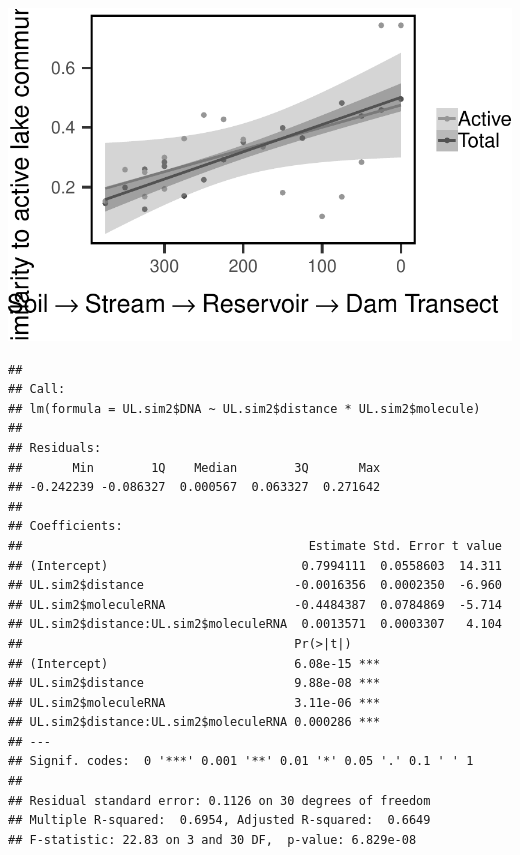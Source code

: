 \documentclass[]{article}
\newenvironment{Shaded}{\begin{snugshade}}{\end{snugshade}}
\newcommand{\KeywordTok}[1]{\textcolor[rgb]{0.13,0.29,0.53}{\textbf{#1}}}
\newcommand{\StringTok}[1]{\textcolor[rgb]{0.31,0.60,0.02}{#1}}
\newcommand{\CommentTok}[1]{\textcolor[rgb]{0.56,0.35,0.01}{\textit{#1}}}
\newcommand{\OperatorTok}[1]{\textcolor[rgb]{0.81,0.36,0.00}{\textbf{#1}}}
\newcommand{\NormalTok}[1]{#1}
\begin{document}
\begin{center}\includegraphics[width=0.7\linewidth]{ReservoirGradient_files/figure-latex/unnamed-chunk-8-2} \end{center}

\begin{Shaded}
\end{Shaded}

\begin{verbatim}
## 
## Call:
## lm(formula = UL.sim2$DNA ~ UL.sim2$distance * UL.sim2$molecule)
## 
## Residuals:
##       Min        1Q    Median        3Q       Max 
## -0.242239 -0.086327  0.000567  0.063327  0.271642 
## 
## Coefficients:
##                                        Estimate Std. Error t value
## (Intercept)                           0.7994111  0.0558603  14.311
## UL.sim2$distance                     -0.0016356  0.0002350  -6.960
## UL.sim2$moleculeRNA                  -0.4484387  0.0784869  -5.714
## UL.sim2$distance:UL.sim2$moleculeRNA  0.0013571  0.0003307   4.104
##                                      Pr(>|t|)    
## (Intercept)                          6.08e-15 ***
## UL.sim2$distance                     9.88e-08 ***
## UL.sim2$moleculeRNA                  3.11e-06 ***
## UL.sim2$distance:UL.sim2$moleculeRNA 0.000286 ***
## ---
## Signif. codes:  0 '***' 0.001 '**' 0.01 '*' 0.05 '.' 0.1 ' ' 1
## 
## Residual standard error: 0.1126 on 30 degrees of freedom
## Multiple R-squared:  0.6954, Adjusted R-squared:  0.6649 
## F-statistic: 22.83 on 3 and 30 DF,  p-value: 6.829e-08
\end{verbatim}
\end{document}
